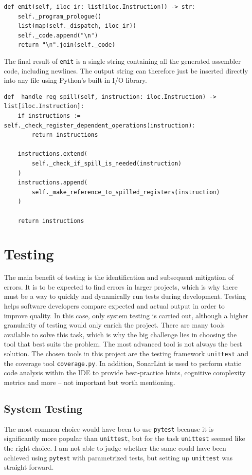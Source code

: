 \begin{verbatim}
def emit(self, iloc_ir: list[iloc.Instruction]) -> str:
    self._program_prologue()
    list(map(self._dispatch, iloc_ir))
    self._code.append("\n")
    return "\n".join(self._code)
\end{verbatim}

The final result of \texttt{emit} is a single string containing all the generated assembler code, including newlines. The output string can therefore just be inserted directly into any file using Python's built-in I/O library.

\begin{verbatim}
def _handle_reg_spill(self, instruction: iloc.Instruction) -> list[iloc.Instruction]:
    if instructions := self._check_register_dependent_operations(instruction):
        return instructions

    instructions.extend(
        self._check_if_spill_is_needed(instruction)
    )
    instructions.append(
        self._make_reference_to_spilled_registers(instruction)
    )

    return instructions
\end{verbatim}

\chapter{Testing}
The main benefit of testing is the identification and subsequent mitigation of errors. It is to be expected to find errors in larger projects, which is why there must be a way to quickly and dynamically run tests during development. Testing helps software developers compare expected and actual output in order to improve quality. In this case, only system testing is carried out, although a higher granularity of testing would only enrich the project. There are many tools available to solve this task, which is why the big challenge lies in choosing the tool that best suits the problem. The most advanced tool is not always the best solution. The chosen tools in this project are the testing framework \texttt{unittest} and the coverage tool \texttt{coverage.py}. In addition, SonarLint is used to perform static code analysis within the IDE to provide best-practice hints, cognitive complexity metrics and more -- not important but worth mentioning.

\section{System Testing}
The most common choice would have been to use \texttt{pytest} because it is significantly more popular than \texttt{unittest}, but for the task \texttt{unittest} seemed like the right choice. I am not able to judge whether the same could have been achieved using \texttt{pytest} with parametrized tests, but setting up \texttt{unittest} was straight forward.

